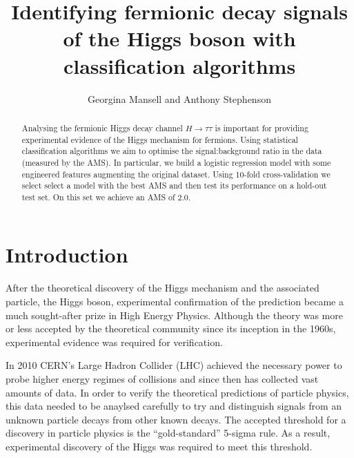 

\usepackage[toc,page]{appendix}
\usepackage{fancyhdr}
\usepackage{enumitem}
\usepackage{pifont}

\graphicspath{{./figs/}}

\pagestyle{fancy}
\rhead{}
\lhead{}

\author{Georgina Mansell and Anthony Stephenson}
\date{}
\title{Identifying fermionic decay signals of the Higgs boson with classification algorithms}


\maketitle
\begin{abstract}
    Analysing the fermionic Higgs decay channel $H\rightarrow\tau\tau$ is important for providing experimental evidence of the Higgs mechanism for fermions. Using statistical classification algorithms we aim to optimise the signal:background ratio in the data (measured by the AMS). In particular, we build a logistic regression model with some engineered features augmenting the original dataset. Using 10-fold cross-validation we select select a model with the best AMS and then test its performance on a hold-out test set. On this set we achieve an AMS of 2.0.
\end{abstract}

\section{Introduction}
After the theoretical discovery of the Higgs mechanism and the associated particle, the Higgs boson, experimental confirmation of the prediction became a much sought-after prize in High Energy Physics. Although the theory was more or less accepted by the theoretical community since its inception in the 1960s, experimental evidence was required for verification. 

In 2010 CERN's Large Hadron Collider (LHC) achieved the necessary power to probe higher energy regimes of collisions and since then has collected vast amounts of data. In order to verify the theoretical predictions of particle physics, this data needed to be anaylsed carefully to try and distinguish signals from an unknown particle decays from other known decays. The accepted threshold for a discovery in particle physics is the ``gold-standard'' 5-sigma rule. As a result, experimental discovery of the Higgs was required to meet this threshold. 

